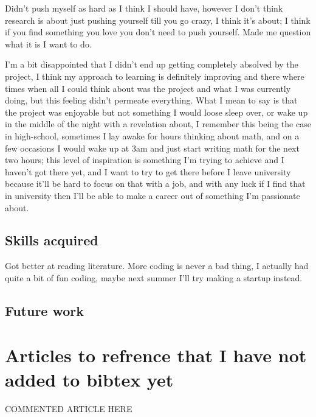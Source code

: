 \documentclass[12pt]{article}
\begin{document}
Didn't push myself as hard as I think I should have, however I don't think research is about just pushing yourself till you go crazy, I think it's about; I think if you find something you love you don't need to push yourself. Made me question what it is I want to do. 

I'm a bit disappointed that I didn't end up getting completely absolved by the project, I think my approach to learning is definitely improving and there where times when all I could think about was the project and what I was currently doing, but this feeling didn't permeate everything. What I mean to say is that the project was enjoyable but not something I would loose sleep over, or wake up in the middle of the night with a revelation about, I remember this being the case in high-school, sometimes I lay awake for hours thinking about math, and on a few occasions I would wake up at 3am and just start writing math for the next two hours; this level of inspiration is something I'm trying to achieve and I haven't got there yet, and I want to try to get there before I leave university because it'll be hard to focus on that with a job, and with any luck if I find that in university then I'll be able to make a career out of something I'm passionate about. 

\subsection{Skills acquired}
Got better at reading literature. More coding is never a bad thing, I actually had quite a bit of fun coding, maybe next summer I'll try making a startup instead.


\subsection{Future work}




\section{Articles to refrence that I have not added to bibtex yet}
COMMENTED ARTICLE HERE
\end{document}
